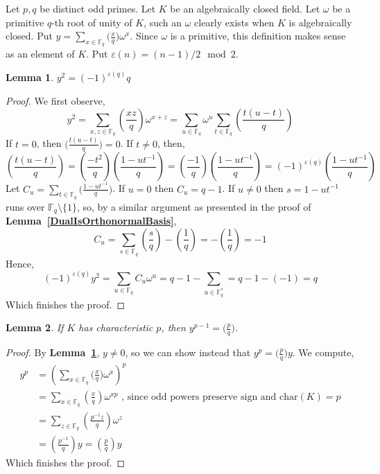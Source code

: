 \documentclass[12pt]{article}
\newcommand{\lref}[1]{\textbf{Lemma~\ref{#1}}}
\newtheorem{lemma}{Lemma}
\numberwithin{equation}{section}
\numberwithin{thm}{section}
\numberwithin{lemma}{section}
\numberwithin{cor}{section}
\begin{document}
Let $p,q$ be distinct odd primes. Let $K$ be an algebraically closed field. Let $\omega$ be a primitive $q$-th root of unity of $K$, such an $\omega$ clearly exists when $K$ is algebraically closed. Put $y = \sum_{x \in \mathbb{F}_q} \big( \frac{x}{q} \big) \omega^x$. Since $\omega$ is a primitive, this definition makes sense as an element of $K$. Put $\varepsilon(n) = (n-1)/2 \mod 2$.

\begin{lemma}\label{GaussSumLemma1}
  $y^2 = (-1)^{\varepsilon(q)} q$
\end{lemma}
\begin{proof}
  We first observe, \begin{equation*}
    y^2 = \sum_{x, z \in \mathbb{F}_q} \left( \frac{xz}{q} \right) \omega^{x + z} = \sum_{u \in \mathbb{F}_q} \omega^u \sum_{t \in \mathbb{F}_q} \left( \frac{t(u-t)}{q} \right)
  \end{equation*} If $t = 0$, then $\big( \frac{t(u-t)}{q} \big) = 0$. If $t \ne 0$, then, \begin{equation*}
    \left( \frac{t(u-t)}{q} \right) =  \left( \frac{-t^2}{q} \right) \left( \frac{1 - ut^{-1}}{q} \right) = \left( \frac{-1}{q} \right) \left( \frac{1 - ut^{-1}}{q} \right) = (-1)^{\varepsilon(q)} \left( \frac{1 - ut^{-1}}{q} \right)
  \end{equation*} Let $C_u = \sum_{t \in \mathbb{F}_q} \big( \frac{1 - ut^{-1}}{q} \big)$. If $u = 0$ then $C_u = q - 1$. If $u \ne 0$ then $s = 1 - ut^{-1}$ runs over $\mathbb{F}_q \setminus \{ 1\}$, so, by a similar argument as presented in the proof of \lref{DualIsOrthonormalBasis}, \begin{equation*}
    C_u = \sum_{s \in \mathbb{F}_q} \left( \frac{s}{q} \right) - \left( \frac{1}{q} \right) = - \left( \frac{1}{q} \right) = -1
  \end{equation*} Hence, \begin{equation*}
    (-1)^{\varepsilon(q)} y^2 = \sum_{u \in \mathbb{F}_q} C_u \omega^u = q - 1 - \sum_{u \in \mathbb{F}_q^*} = q - 1 - (-1) = q
  \end{equation*} Which finishes the proof.
\end{proof}

\begin{lemma}\label{GaussSumLemma2}
  If $K$ has characteristic $p$, then $y^{p-1} = \big( \frac{p}{q} \big)$.
\end{lemma}
\begin{proof}
  By \lref{GaussSumLemma1}, $y \ne 0$, so we can show instead that $y^p = \big( \frac{p}{q} \big)y$. We compute, \begin{align*}
    y^p &= \left( \sum_{x \in \mathbb{F}_q} \bigg( \frac{x}{q} \bigg) \omega^x \right)^p \\
    &= \sum_{x \in \mathbb{F}_q} \left( \frac{x}{q} \right) \omega^{xp} \text{ , since odd powers preserve sign and char}(K) = p \\
    &= \sum_{z \in \mathbb{F}_q} \left( \frac{p^{-1}z}{q} \right) \omega^{z} \\
    &= \left( \frac{p^{-1}}{q} \right)y = \left( \frac{p}{q} \right)y
  \end{align*} Which finishes the proof.
\end{proof}
\end{document}
